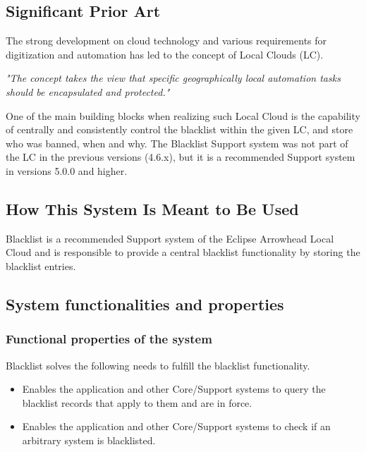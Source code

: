 \documentclass[a4paper]{arrowhead}
\begin{document}
\subsection{Significant Prior Art}
\label{sec:prior_art}

The strong development on cloud technology and various requirements for digitization and automation has led to the concept of Local Clouds (LC).

\textit{"The concept takes the view that specific geographically local automation tasks should be encapsulated and protected."} \cite{jerker2017localclouds}

One of the main building blocks when realizing such Local Cloud is the capability of centrally and consistently control the blacklist within the given LC, and store who was banned, when and why. The Blacklist Support system was not part of the LC in the previous versions (4.6.x), but it is a recommended Support system in versions 5.0.0 and higher.


\subsection{How This System Is Meant to Be Used}
\label{sec:use}

Blacklist is a recommended Support system of the Eclipse Arrowhead Local Cloud and is responsible to provide a central blacklist functionality by storing the blacklist entries.

\subsection{System functionalities and properties}
\label{sec:properties}

\subsubsection {Functional properties of the system}
Blacklist solves the following needs to fulfill the blacklist functionality.

\begin{itemize}
    \item Enables the application and other Core/Support systems to query the blacklist records that apply to them and are in force.
    \item Enables the application and other Core/Support systems to check if an arbitrary system is blacklisted.
\end{itemize}
\end{document}

